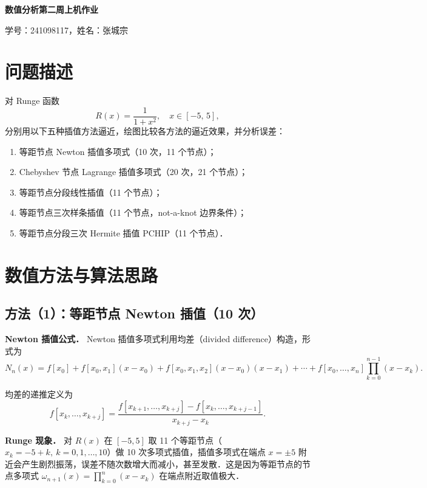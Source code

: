 \documentclass[UTF8,a4paper,11pt]{article}
\begin{document}
\begin{center}
{\huge \textbf{数值分析第二周上机作业}}

\vspace{0.3cm}
{\large 学号：241098117\quad，姓名：张城宗\quad}
\end{center}

\section{问题描述}

对 Runge 函数
$$R(x) = \frac{1}{1+x^2}, \quad x \in [-5,\,5],$$
分别用以下五种插值方法逼近，绘图比较各方法的逼近效果，并分析误差：

\begin{enumerate}
  \item 等距节点 Newton 插值多项式（10 次，11 个节点）；
  \item Chebyshev 节点 Lagrange 插值多项式（20 次，21 个节点）；
  \item 等距节点分段线性插值（11 个节点）；
  \item 等距节点三次样条插值（11 个节点，not-a-knot 边界条件）；
  \item 等距节点分段三次 Hermite 插值 PCHIP（11 个节点）．
\end{enumerate}

\section{数值方法与算法思路}

\subsection{方法（1）：等距节点 Newton 插值（10 次）}

\noindent\textbf{Newton 插值公式．}
Newton 插值多项式利用均差（divided difference）构造，形式为
$$N_n(x) = f[x_0] + f[x_0,x_1](x-x_0) + f[x_0,x_1,x_2](x-x_0)(x-x_1) + \cdots + f[x_0,\ldots,x_n]\prod_{k=0}^{n-1}(x-x_k).$$

均差的递推定义为
$$f[x_k,\ldots,x_{k+j}] = \frac{f[x_{k+1},\ldots,x_{k+j}] - f[x_k,\ldots,x_{k+j-1}]}{x_{k+j} - x_k}.$$

\noindent\textbf{Runge 现象．}
对 $R(x)$ 在 $[-5,5]$ 取 11 个等距节点（$x_k = -5+k,\ k=0,1,\ldots,10$）做 10 次多项式插值，插值多项式在端点 $x=\pm5$ 附近会产生剧烈振荡，误差不随次数增大而减小，甚至发散．这是因为等距节点的节点多项式 $\omega_{n+1}(x) = \prod_{k=0}^{n}(x-x_k)$ 在端点附近取值极大．
\end{document}
